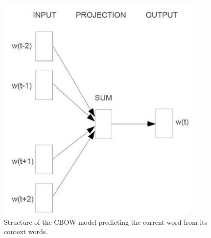 \begin{center}
\begin{figure}[tb]
\centering
\begin{minipage}{.49\textwidth}
 
	\includegraphics[width=0.9\textwidth]{CBOW} 
	\caption{Structure of the CBOW model predicting the current word from its context words.}
	\label{fig:CBOW}
\end{minipage}%
\hspace{.01\textwidth}
\begin{minipage}{.49\textwidth}
  

\end{minipage}
\end{figure}
\end{center}
